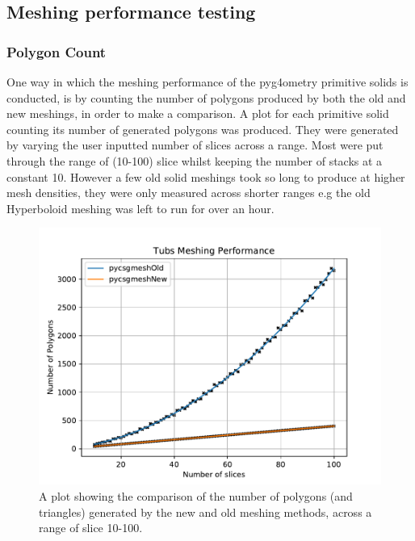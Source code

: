 \documentclass[12pt,a4paper]{article}
\begin{document}
\begin{figure}[h!]
\begin{minipage}{.4\textwidth}
  \label{sub}
\end{minipage}%
\end{figure}

\newpage
\subsection{Meshing performance testing}
\subsubsection{Polygon Count}
One way in which the meshing performance of the pyg4ometry primitive solids is conducted, is by counting the number of polygons produced by both the old and new meshings, in order to make a comparison. A plot for each primitive solid counting its number of generated polygons was produced. They were generated by varying the user inputted number of slices across a range. Most were put through the range of (10-100) slice whilst keeping the number of stacks at a constant 10. However a few old solid meshings took so long to produce at higher mesh densities, they were only measured across shorter ranges e.g the old Hyperboloid meshing was left to run for over an hour.  \\

\begin{figure}[h!]
\centering
\includegraphics[scale=0.6]{Images//Quad_fits//Tubs_quad.pdf}
\caption[width=\columnwidth]{A plot showing the comparison of the number of polygons (and triangles) generated by the new and old meshing methods, across a range of slice 10-100.}
\label{conts}
\end{figure}
\end{document}
